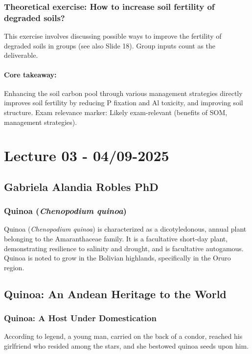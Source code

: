 \subsubsection{Theoretical exercise: How to increase soil fertility of degraded soils?} 
This exercise involves discussing possible ways to improve the fertility of degraded soils in groups (see also Slide 18). Group inputs count as the deliverable.

\paragraph*{Core takeaway:} 
Enhancing the soil carbon pool through various management strategies directly improves soil fertility by reducing P fixation and Al toxicity, and improving soil structure. Exam relevance marker: Likely exam-relevant (benefits of SOM, management strategies).

\section{Lecture 03 - 04/09-2025}


\subsection{Gabriela Alandia Robles PhD} 
\subsubsection{Quinoa (\textit{Chenopodium quinoa})} 
Quinoa (\textit{Chenopodium quinoa}) is characterized as a dicotyledonous, annual plant belonging to the Amaranthaceae family. It is a facultative short-day plant, demonstrating resilience to salinity and drought, and is facultative autogamous. Quinoa is noted to grow in the Bolivian highlands, specifically in the Oruro region.
\subsection{Quinoa: An Andean Heritage to the World} 

\subsubsection{Quinoa: A Host Under Domestication} 
According to legend, a young man, carried on the back of a condor, reached his girlfriend who resided among the stars, and she bestowed quinoa seeds upon him.

